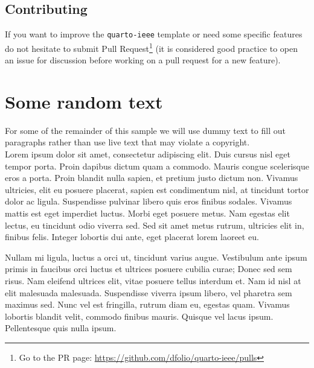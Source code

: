 \documentclass[
  journal,
]{IEEEtran}%
\theoremstyle{plain}
\theoremstyle{remark}
\begin{document}
\hypertarget{contributing}{%
\subsection{Contributing}\label{contributing}}

If you want to improve the \texttt{quarto-ieee} template or need some
specific features do not hesitate to submit Pull Request\footnote{Go to
  the PR page: \url{https://github.com/dfolio/quarto-ieee/pulls}} (it is
considered good practice to open an issue for discussion before working
on a pull request for a new feature).

\hypertarget{some-random-text}{%
\section{Some random text}\label{some-random-text}}

For some of the remainder of this sample we will use dummy text to fill
out paragraphs rather than use live text that may violate a copyright.
\IEEEpubidadjcol\\
Lorem ipsum dolor sit amet, consectetur adipiscing elit. Duis cursus
nisl eget tempor porta. Proin dapibus dictum quam a commodo. Mauris
congue scelerisque eros a porta. Proin blandit nulla sapien, et pretium
justo dictum non. Vivamus ultricies, elit eu posuere placerat, sapien
est condimentum nisl, at tincidunt tortor dolor ac ligula. Suspendisse
pulvinar libero quis eros finibus sodales. Vivamus mattis est eget
imperdiet luctus. Morbi eget posuere metus. Nam egestas elit lectus, eu
tincidunt odio viverra sed. Sed sit amet metus rutrum, ultricies elit
in, finibus felis. Integer lobortis dui ante, eget placerat lorem
laoreet eu.

Nullam mi ligula, luctus a orci ut, tincidunt varius augue. Vestibulum
ante ipsum primis in faucibus orci luctus et ultrices posuere cubilia
curae; Donec sed sem risus. Nam eleifend ultrices elit, vitae posuere
tellus interdum et. Nam id nisl at elit malesuada malesuada. Suspendisse
viverra ipsum libero, vel pharetra sem maximus sed. Nunc vel est
fringilla, rutrum diam eu, egestas quam. Vivamus lobortis blandit velit,
commodo finibus mauris. Quisque vel lacus ipsum. Pellentesque quis nulla
ipsum.
\end{document}

